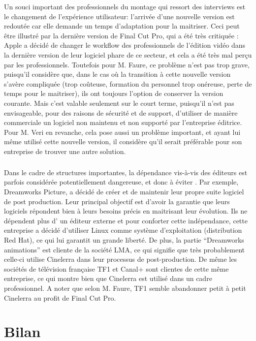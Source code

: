 Un souci important des professionnels du montage qui ressort
des interviews est le changement de l'expérience utilisateur:
l'arrivée d'une nouvelle version est redoutée car elle demande un
temps d'adaptation pour la maitriser.  Ceci peut être illustré par
la dernière version de Final Cut Pro, qui a été très critiquée
\cite{FinalCutProXReviews}: Apple a décidé de changer le workflow
 des professionnels de l'édition vidéo dans la dernière
version de leur logiciel phare de ce secteur, et cela a été très mal
perçu par les professionnels. Toutefois pour M. Faure, ce problème n'est
pas trop grave, puisqu'il considère que, dans le cas où la transition
à cette nouvelle version s'avère compliquée (trop coûteuse, formation
du personnel trop onéreuse, perte de temps pour le maitriser), ils ont
toujours l'option de conserver la version courante.
Mais c'est valable seulement sur le court terme, puisqu'il n'est pas
envisageable, pour des raisons de sécurité et de support, d'utiliser
de manière commerciale un logiciel non maintenu et non supporté par
l'entreprise éditrice. Pour M. Veri en revanche, cela pose aussi un
problème important, et ayant lui même utilisé cette nouvelle version,
il considère qu'il serait préférable pour son entreprise de trouver
une autre solution.

\subparagraph{}

Dans le cadre de structures importantes, la dépendance vis-à-vis
des éditeurs est parfois considérée potentiellement dangereuse,
et donc à éviter . Par exemple, Dreamworks Picture, a décidé de
créer et de maintenir leur propre suite logiciel \cite {Dreamworks}
de post production. Leur principal objectif  est d'avoir la garantie que
leurs logiciels répondent bien à leurs besoins précis en maitrisant
leur évolution. Ils ne dépendent plus d' un éditeur externe et pour
conforter cette indépendance, cette entreprise a décidé d'utiliser
Linux comme système d'exploitation (distribution Red Hat), ce qui lui
garantit un grande liberté. De plus, la partie ``Dreamworks animations''
est cliente de la société LMA, ce qui signifie que très probablement
celle-ci utilise Cinelerra dans leur processus de post-production. De
même les sociétés de télévision française TF1 et Canal+ sont
clientes de cette même entreprise, ce qui montre bien que Cinelerra
est utilisé dans un cadre professionnel. A noter que selon M. Faure,
TF1 semble abandonner petit à petit Cinelerra au profit de Final Cut Pro.

\newpage

\section {Bilan}

